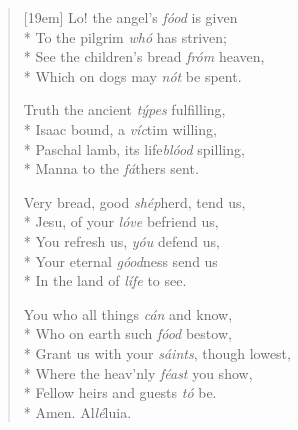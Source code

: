 \documentclass[12pt]{memoir}
\begin{document}
\begin{multicols}{2}
\begin{verse}[19em]
Lo! the angel's \textit{f\'{o}od} is given \\*
To the pilgrim \textit{wh\'{o}} has striven; \\*
See the children's bread \textit{fr\'{o}m} heaven, \\*
Which on dogs may \textit{n\'{o}t} be spent.

Truth the ancient \textit{t\'{y}pes} fulfilling, \\*
Isaac bound, a \textit{v\'{i}c}tim willing, \\*
Paschal lamb, its life\textit{bl\'{o}od} spilling, \\*
Manna to the \textit{f\'{a}}thers sent.

Very bread, good \textit{sh\'{e}p}herd, tend us, \\*
Jesu, of your \textit{l\'{o}ve} befriend us, \\*
You refresh us, \textit{y\'{o}u} defend us, \\*
Your eternal \textit{g\'{o}od}ness send us \\*
In the land of \textit{l\'{i}fe} to see.

You who all things \textit{c\'{a}n} and know, \\*
Who on earth such \textit{f\'{o}od} bestow, \\*
Grant us with your \textit{s\'{a}ints}, though lowest, \\*
Where the heav'nly \textit{f\'{e}ast} you show, \\*
Fellow heirs and guests \textit{t\'{o}} be. \\*
Amen. Al\textit{l\'{e}}luia.

\end{verse}
\end{multicols}
\end{document}
